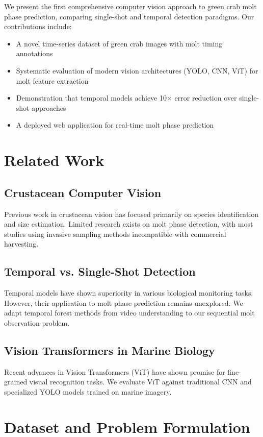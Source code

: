 \documentclass[10pt,twocolumn,letterpaper]{article}
\begin{document}
We present the first comprehensive computer vision approach to green crab molt phase prediction, comparing single-shot and temporal detection paradigms. Our contributions include:

\begin{itemize}
\item A novel time-series dataset of green crab images with molt timing annotations
\item Systematic evaluation of modern vision architectures (YOLO, CNN, ViT) for molt feature extraction
\item Demonstration that temporal models achieve 10× error reduction over single-shot approaches
\item A deployed web application for real-time molt phase prediction
\end{itemize}

\section{Related Work}

\subsection{Crustacean Computer Vision}
Previous work in crustacean vision has focused primarily on species identification and size estimation. Limited research exists on molt phase detection, with most studies using invasive sampling methods incompatible with commercial harvesting.

\subsection{Temporal vs. Single-Shot Detection}
Temporal models have shown superiority in various biological monitoring tasks. However, their application to molt phase prediction remains unexplored. We adapt temporal forest methods from video understanding to our sequential molt observation problem.

\subsection{Vision Transformers in Marine Biology}
Recent advances in Vision Transformers (ViT) have shown promise for fine-grained visual recognition tasks. We evaluate ViT against traditional CNN and specialized YOLO models trained on marine imagery.

\section{Dataset and Problem Formulation}
\end{document}
